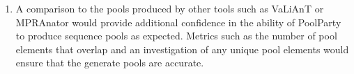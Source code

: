 \documentclass[11pt]{article}
\newenvironment{response}{\par\color{responseblue}}{\par}
\newenvironment{msquote}
  {\begin{quote}\color{responseblue}\itshape\noindent\ignorespaces}
  {\end{quote}}
\begin{document}
\begin{enumerate}
\begin{response}
The new Supplemental Information document includes a figure, Fig.~S1, that breaks down the forward and backward pass computations in much more detail. We believe this will answer the Reviewer's questions. 
\end{response}



\item A comparison to the pools produced by other tools such as VaLiAnT or
MPRAnator would provide additional confidence in the ability of PoolParty to
produce sequence pools as expected. Metrics such as the number of pool elements that overlap and an investigation of any unique pool elements would ensure that the generate pools are accurate.


\end{enumerate}
\end{document}
